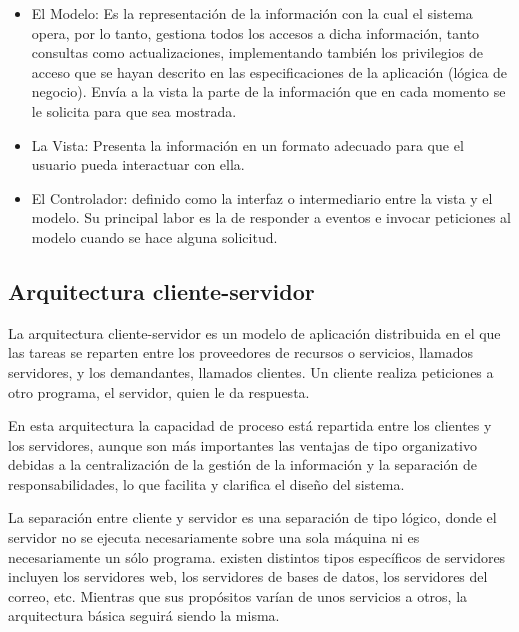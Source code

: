 \begin{itemize}

\item El Modelo: Es la representación de la información con la cual el sistema opera, por lo tanto, gestiona todos los accesos a dicha información, tanto consultas como actualizaciones, implementando también los privilegios de acceso que se hayan descrito en las especificaciones de la aplicación (lógica de negocio). Envía a la vista la parte de la información que en cada momento se le solicita para que sea mostrada.

\item La Vista: Presenta la información en un formato adecuado para que el usuario pueda interactuar con ella.

\item El Controlador: definido como la interfaz o intermediario entre la vista y el modelo. Su principal labor es la de responder a eventos e invocar peticiones al modelo cuando se hace alguna solicitud. 

\end{itemize}

\subsection{Arquitectura cliente-servidor}

La arquitectura cliente-servidor es un modelo de aplicación distribuida en el que las tareas se reparten entre los proveedores de recursos o servicios, llamados servidores, y los demandantes, llamados clientes. Un cliente realiza peticiones a otro programa, el servidor, quien le da respuesta.

En esta arquitectura la capacidad de proceso está repartida entre los clientes y los servidores, aunque son más importantes las ventajas de tipo organizativo debidas a la centralización de la gestión de la información y la separación de responsabilidades, lo que facilita y clarifica el diseño del sistema.

La separación entre cliente y servidor es una separación de tipo lógico, donde el servidor no se ejecuta necesariamente sobre una sola máquina ni es necesariamente un sólo programa. existen distintos tipos específicos de servidores incluyen los servidores web, los servidores de bases de datos, los servidores del correo, etc. Mientras que sus propósitos varían de unos servicios a otros, la arquitectura básica seguirá siendo la misma\cite{bib:clienteServidor}.

